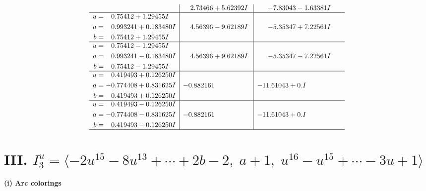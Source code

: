 \documentclass[1p]{elsarticle_modified}
\theoremstyle{definition}
\begin{document}
$$\begin{array}{c|c|c}
 & \phantom{-}2.73466 + 5.62392 I & -7.83043 - 1.63381 I \\ \hline\begin{aligned}
u &= \phantom{-}0.75412 + 1.29455 I \\
a &= \phantom{-}0.993241 + 0.183480 I \\
b &= \phantom{-}0.75412 + 1.29455 I\end{aligned}
 & \phantom{-}4.56396 - 9.62189 I & -5.35347 + 7.22561 I \\ \hline\begin{aligned}
u &= \phantom{-}0.75412 - 1.29455 I \\
a &= \phantom{-}0.993241 - 0.183480 I \\
b &= \phantom{-}0.75412 - 1.29455 I\end{aligned}
 & \phantom{-}4.56396 + 9.62189 I & -5.35347 - 7.22561 I \\ \hline\begin{aligned}
u &= \phantom{-}0.419493 + 0.126250 I \\
a &= -0.774408 + 0.831625 I \\
b &= \phantom{-}0.419493 + 0.126250 I\end{aligned}
 & -0.882161\phantom{ +0.000000I} & -11.61043 + 0. I\phantom{ +0.000000I} \\ \hline\begin{aligned}
u &= \phantom{-}0.419493 - 0.126250 I \\
a &= -0.774408 - 0.831625 I \\
b &= \phantom{-}0.419493 - 0.126250 I\end{aligned}
 & -0.882161\phantom{ +0.000000I} & -11.61043 + 0. I\phantom{ +0.000000I}\\
 \hline 
 \end{array}$$\newpage\newpage\renewcommand{\arraystretch}{1}
\centering \section*{III. $I^u_{3}= \langle -2 u^{15}-8 u^{13}+\cdots+2 b-2,\;a+1,\;u^{16}- u^{15}+\cdots-3 u+1 \rangle$}
\flushleft \textbf{(i) Arc colorings}\\
\end{document}
